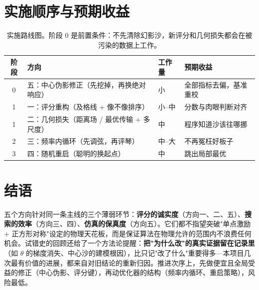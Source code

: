\documentclass[11pt,a4paper]{article}
\begin{document}
\section{实施顺序与预期收益}

\begin{table}[h]
\centering
\begin{tabular}{@{}clll@{}}
\toprule
阶段 & 方向 & 工作量 & 预期收益 \\
\midrule
0 & 五：中心伪影修正（先挖掉，再换绝对响应） & 小 & 全部指标去偏，基准重校 \\
1 & 一：评分重构（及格线 + 像不像排序） & 小--中 & 分数与肉眼判断对齐 \\
1 & 二：几何损失（距离场 / 最优传输 + 多尺度） & 中 & 程序知道沙该往哪挪 \\
2 & 三：频率内循环（先调弦，再评琴） & 中--大 & 不再冤枉好板子 \\
3 & 四：随机重启（聪明的换起点） & 中 & 跳出局部最优 \\
\bottomrule
\end{tabular}
\caption{实施路线图。阶段 0 是前置条件：不先清除幻影沙，新评分和几何损失都会在被污染的数据上工作。}
\end{table}

\section{结语}

五个方向针对同一条主线的三个薄弱环节：\textbf{评分的诚实度}（方向一、二、五）、\textbf{搜索的效率}（方向三、四）、\textbf{仿真的保真度}（方向五）。它们都不指望突破"单点激励 + 正方形对称"设定的物理天花板，而是保证算法在物理允许的范围内不浪费任何机会。试错史的回顾还给了一个方法论提醒：\textbf{把"为什么改"的真实证据留在记录里}（如 $\theta$ 的梯度消失、中心沙的建模根因），比只记"改了什么"重要得多---本项目几次最有价值的进展，都来自对旧结论的重新归因。推进次序上，先做便宜且全局受益的修正（中心伪影、评分键），再动优化器的结构（频率内循环、重启策略），风险最低。
\end{document}
